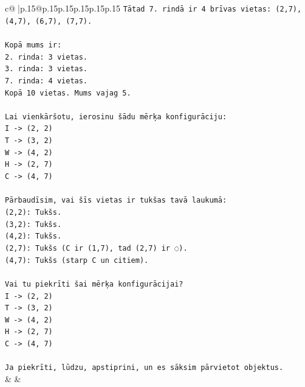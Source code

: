 \documentclass{article}
\begin{document}
{\begin{supertabular}{c@{$\;$}|p{.15\linewidth}@{}p{.15\linewidth}p{.15\linewidth}p{.15\linewidth}p{.15\linewidth}p{.15\linewidth}}
{{{\texttt{Tātad 7. rindā ir 4 brīvas vietas: (2,7), (4,7), (6,7), (7,7).} \\
\\ 
\texttt{Kopā mums ir:} \\
\texttt{2. rinda: 3 vietas.} \\
\texttt{3. rinda: 3 vietas.} \\
\texttt{7. rinda: 4 vietas.} \\
\texttt{Kopā 10 vietas. Mums vajag 5.} \\
\\ 
\texttt{Lai vienkāršotu, ierosinu šādu mērķa konfigurāciju:} \\
\texttt{I {-}> (2, 2)} \\
\texttt{T {-}> (3, 2)} \\
\texttt{W {-}> (4, 2)} \\
\texttt{H {-}> (2, 7)} \\
\texttt{C {-}> (4, 7)} \\
\\ 
\texttt{Pārbaudīsim, vai šīs vietas ir tukšas tavā laukumā:} \\
\texttt{(2,2): Tukšs.} \\
\texttt{(3,2): Tukšs.} \\
\texttt{(4,2): Tukšs.} \\
\texttt{(2,7): Tukšs (C ir (1,7), tad (2,7) ir ◌).} \\
\texttt{(4,7): Tukšs (starp C un citiem).} \\
\\ 
\texttt{Vai tu piekrīti šai mērķa konfigurācijai?} \\
\texttt{I {-}> (2, 2)} \\
\texttt{T {-}> (3, 2)} \\
\texttt{W {-}> (4, 2)} \\
\texttt{H {-}> (2, 7)} \\
\texttt{C {-}> (4, 7)} \\
\\ 
\texttt{Ja piekrīti, lūdzu, apstiprini, un es sāksim pārvietot objektus.} \\
            }
        }
    }
    & & \\ \\


\end{supertabular}}
\end{document}
